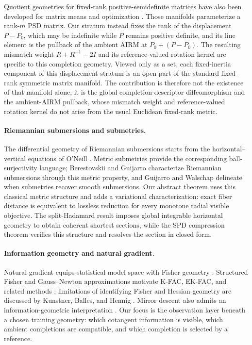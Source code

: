 Quotient geometries for fixed-rank positive-semidefinite matrices have also
been developed for matrix means and optimization
\citep{bonnabel2010fixedrank,vandereycken2013fixedrank,massart2020quotient}.
Those manifolds parameterize a rank-\(m\) PSD matrix.  Our stratum instead
fixes the rank of the displacement \(P-P_0\), which may be indefinite while
\(P\) remains positive definite, and its line element is the pullback of the
ambient AIRM at \(P_0+(P-P_0)\).  The resulting mismatch weight
\(R+R^{-1}-2I\) and its reference-valued rotation kernel are specific to this
completion geometry.
Viewed only as a set, each fixed-inertia component of this displacement
stratum is an open part of the standard fixed-rank symmetric matrix manifold.
The contribution is therefore not the existence of that manifold alone; it is
the global completion-descriptor diffeomorphism and the ambient-AIRM pullback,
whose mismatch weight and reference-valued rotation kernel do not arise from
the usual Euclidean fixed-rank metric.

\paragraph{Riemannian submersions and submetries.}
The differential geometry of Riemannian submersions starts from the
horizontal--vertical equations of O'Neill \citep{oneill1966submersion}.
Metric submetries provide the corresponding ball-surjectivity language;
Berestovskii and Guijarro \citep{berestovskii2000metric} characterize
Riemannian submersions through this metric property, and Guijarro and
Walschap \citep{guijarro2011submetries} delineate when submetries recover
smooth submersions.  Our abstract theorem uses this
classical metric structure and adds a variational characterization: exact
fiber distance is equivalent to lossless reduction for every monotone radial
visible objective.  The split-Hadamard result imposes global integrable
horizontal geometry to obtain coherent shortest sections, while the SPD
compression theorem verifies this structure and resolves the section in
closed form.

\paragraph{Information geometry and natural gradient.}
Natural gradient equips statistical model space with Fisher geometry
\citep{amari1998natural}.  Structured Fisher and Gauss--Newton approximations
motivate K-FAC, EK-FAC, and related methods
\citep{martens2015kfac,george2018ekfac,martens2020natural}; limitations of
identifying Fisher and Hessian geometry are discussed by Kunstner, Balles,
and Hennig \citep{kunstner2019limitations}.  Mirror descent also admits an
information-geometric interpretation \citep{raskutti2015information}.  Our
focus is the observation layer beneath a chosen training geometry: which
cotangent information is visible, which ambient completions are compatible,
and which completion is selected by a reference.

